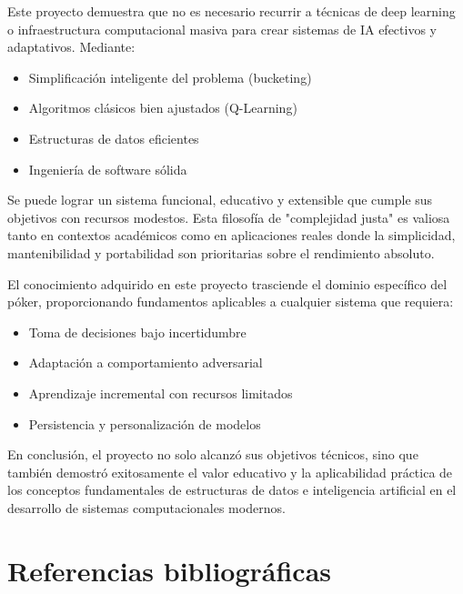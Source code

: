 \documentclass[12pt,a4paper]{article}
\begin{document}
Este proyecto demuestra que no es necesario recurrir a técnicas de deep learning o infraestructura computacional masiva para crear sistemas de IA efectivos y adaptativos. Mediante:

\begin{itemize}
    \item Simplificación inteligente del problema (bucketing)
    \item Algoritmos clásicos bien ajustados (Q-Learning)
    \item Estructuras de datos eficientes
    \item Ingeniería de software sólida
\end{itemize}

Se puede lograr un sistema funcional, educativo y extensible que cumple sus objetivos con recursos modestos. Esta filosofía de "complejidad justa" es valiosa tanto en contextos académicos como en aplicaciones reales donde la simplicidad, mantenibilidad y portabilidad son prioritarias sobre el rendimiento absoluto.

El conocimiento adquirido en este proyecto trasciende el dominio específico del póker, proporcionando fundamentos aplicables a cualquier sistema que requiera:
\begin{itemize}
    \item Toma de decisiones bajo incertidumbre
    \item Adaptación a comportamiento adversarial
    \item Aprendizaje incremental con recursos limitados
    \item Persistencia y personalización de modelos
\end{itemize}

En conclusión, el proyecto no solo alcanzó sus objetivos técnicos, sino que también demostró exitosamente el valor educativo y la aplicabilidad práctica de los conceptos fundamentales de estructuras de datos e inteligencia artificial en el desarrollo de sistemas computacionales modernos.

\newpage


\section{Referencias bibliográficas}
\end{document}
